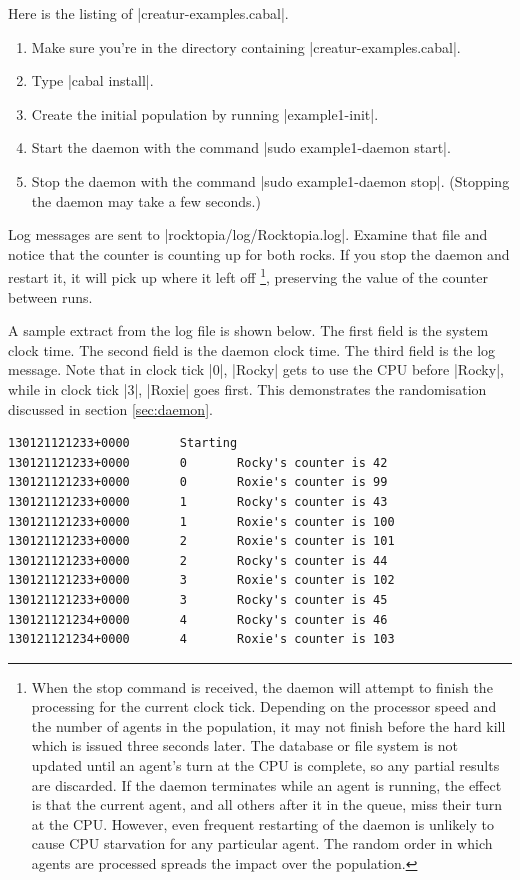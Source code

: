 \documentclass[a4paper,10pt]{article}
\begin{document}
Here is the listing of |creatur-examples.cabal|.


\begin{enumerate}
\item Make sure you're in the directory containing |creatur-examples.cabal|.
\item Type |cabal install|.
\item Create the initial population by running |example1-init|.
\item Start the daemon with the command |sudo example1-daemon start|.
\item Stop the daemon with the command |sudo example1-daemon stop|.
(Stopping the daemon may take a few seconds.)
\end{enumerate}

Log messages are sent to |rocktopia/log/Rocktopia.log|.
Examine that file and notice that the counter is counting up for both rocks.
If you stop the daemon and restart it, it will pick up where it left off
\footnote{When the stop command is received, the daemon will attempt
to finish the processing for the current clock tick.
Depending on the processor speed and the number of agents in the population,
it may not finish before the hard kill which is issued three seconds later.
The database or file system is not updated until an agent's turn at the CPU 
is complete, so any partial results are discarded.
If the daemon terminates while an agent is running,
the effect is that the current agent, and all others after it in the queue,
miss their turn at the CPU.
However, even frequent restarting of the daemon
is unlikely to cause CPU starvation for any particular agent.
The random order in which agents are processed spreads the impact
over the population.}, preserving the value of the 
counter between runs.

A sample extract from the log file is shown below.
The first field is the system clock time.
The second field is the daemon clock time.
The third field is the log message.
Note that in clock tick |0|, |Rocky| gets to use the CPU before |Rocky|,
while in clock tick |3|, |Roxie| goes first.
This demonstrates the randomisation discussed in section \ref{sec:daemon}.

\begin{verbatim}
130121121233+0000       Starting
130121121233+0000       0       Rocky's counter is 42
130121121233+0000       0       Roxie's counter is 99
130121121233+0000       1       Rocky's counter is 43
130121121233+0000       1       Roxie's counter is 100
130121121233+0000       2       Roxie's counter is 101
130121121233+0000       2       Rocky's counter is 44
130121121233+0000       3       Roxie's counter is 102
130121121233+0000       3       Rocky's counter is 45
130121121234+0000       4       Rocky's counter is 46
130121121234+0000       4       Roxie's counter is 103
\end{verbatim}
\end{document}
